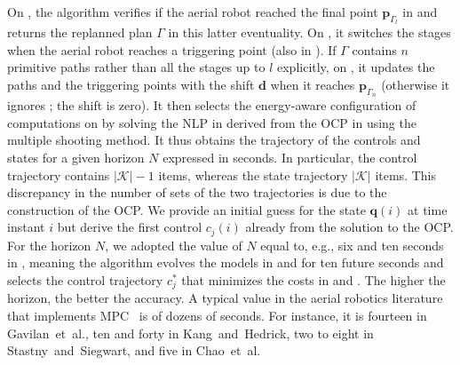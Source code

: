 On , the algorithm verifies if the aerial robot reached the final point $\mathbf{p}_{\Gamma_l}$ in  and returns the replanned plan $\Gamma$ in this latter eventuality. On , it switches the stages when the aerial robot reaches a triggering point (also in ). If $\Gamma$ contains $n$ primitive paths rather than all the stages up to $l$ explicitly, on , it updates the paths and the triggering points with the shift $\mathbf{d}$ when it reaches $\mathbf{p}_{\Gamma_n}$ (otherwise it ignores ; the shift is zero). It then selects the energy-aware configuration of computations on  by solving the NLP in  derived from the OCP in  using the multiple shooting method. It thus obtains the trajectory of the controls and states for a given horizon $N$ expressed in seconds. In particular, the control trajectory contains $|\mathcal{K}|-1$ items, whereas the state trajectory $|\mathcal{K}|$ items. This discrepancy in the number of sets of the two trajectories is due to the construction of the OCP. We provide an initial guess for the state $\mathbf{q}(i)$ at time instant $i$ but derive the first control $c_j(i)$ already from the solution to the OCP. For the horizon $N$, we adopted the value of $N$ equal to, e.g., six and ten seconds in , meaning the algorithm evolves the models in  and  for ten future seconds and selects the control trajectory $c_j^*$ that minimizes the costs in  and . The higher the horizon, the better the accuracy. A typical value in the aerial robotics literature that implements MPC~\citep{gavilan2015iterative,kang2009linear,stastny2018nonlinear,chao2011collision} is of dozens of seconds. For instance, it is fourteen in Gavilan~et~al., ten and forty in Kang~and~Hedrick, two to eight in Stastny~and~Siegwart, and five in Chao~et~al.

